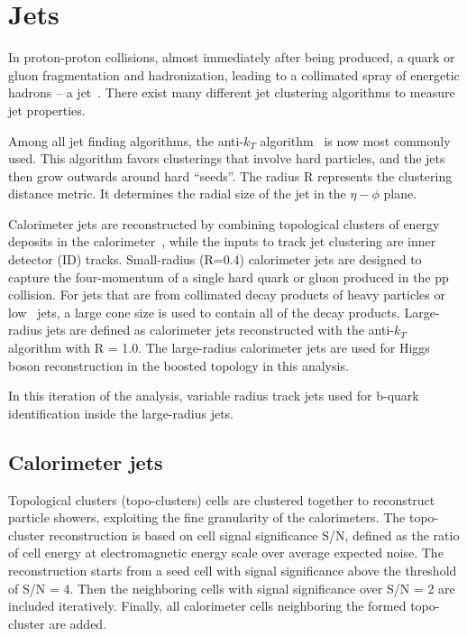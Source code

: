\section{Jets}
\label{sec:jets}

\par In proton-proton collisions, almost immediately after being produced, a quark or gluon fragmentation and hadronization, leading to a collimated spray of energetic hadrons -- 
a jet~\cite{Salam:2009jx}. There exist many different jet clustering algorithms to measure jet properties. 
\par Among all jet finding algorithms, the anti-$k_T$ algorithm~\cite{Cacciari:2008gn} is now most commonly used. This algorithm favors clusterings that involve hard particles, 
and the jets then grow outwards around hard ``seeds''. The radius R represents the clustering distance metric. It determines the radial size of the jet in the $\eta-\phi$ plane.

\par Calorimeter jets are reconstructed by combining topological clusters of energy deposits in the calorimeter~\cite{Aad:2011he}, while the inputs to track jet clustering are inner detector (ID) tracks. 
Small-radius (R=0.4) calorimeter jets are designed to capture the four-momentum of a single hard quark or gluon produced in the pp collision. For jets that are from collimated decay products of heavy particles or low \pt~jets, 
a large cone size is used to contain all of the decay products. Large-radius jets are defined as calorimeter jets reconstructed with the anti-$k_T$ algorithm with R = 1.0. 
The large-radius calorimeter jets are used for Higgs boson reconstruction in the boosted topology in this analysis.

\par In this iteration of the analysis, variable radius track jets used for b-quark identification inside the large-radius jets.

\subsection{Calorimeter jets}
\label{sec:calo}

\par Topological clusters (topo-clusters) cells are clustered together to reconstruct particle showers, exploiting the fine granularity of the calorimeters. 
The topo-cluster reconstruction is based on cell signal significance S/N, defined as the ratio of cell energy at electromagnetic energy scale over average expected noise. 
The reconstruction starts from a seed cell with signal significance above the threshold of S/N = 4. Then the neighboring cells with signal significance over S/N = 2 are included iteratively. 
Finally, all calorimeter cells neighboring the formed topo-cluster are added.

